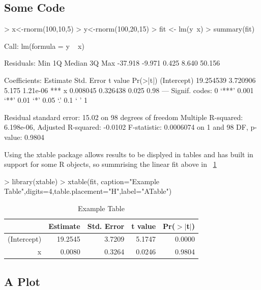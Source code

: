 \documentclass[a4paper]{report}
\begin{document}
\subsection{Some Code}
\begin{Schunk}
\begin{Sinput}
> x<-rnorm(100,10,5)
> y<-rnorm(100,20,15)
> fit <- lm(y~x)
> summary(fit)
\end{Sinput}
\begin{Soutput}
Call:
lm(formula = y ~ x)

Residuals:
    Min      1Q  Median      3Q     Max 
-37.918  -9.971   0.425   8.640  50.156 

Coefficients:
             Estimate Std. Error t value Pr(>|t|)    
(Intercept) 19.254539   3.720906   5.175 1.21e-06 ***
x            0.008045   0.326438   0.025     0.98    
---
Signif. codes:  0 ‘***’ 0.001 ‘**’ 0.01 ‘*’ 0.05 ‘.’ 0.1 ‘ ’ 1

Residual standard error: 15.02 on 98 degrees of freedom
Multiple R-squared:  6.198e-06,	Adjusted R-squared:  -0.0102 
F-statistic: 0.0006074 on 1 and 98 DF,  p-value: 0.9804
\end{Soutput}
\end{Schunk}
Using the xtable package allows results to be displyed in tables and has built in support for some R objects, so summrising the linear fit above in ~\ref{ATable}
\begin{Schunk}
\begin{Sinput}
> library(xtable)
> xtable(fit, caption="Example Table",digits=4,table.placement="H",label="ATable")
\end{Sinput}
\begin{table}[ht]
\centering
\begin{tabular}{rrrrr}
  \hline
 & Estimate & Std. Error & t value & Pr($>$$|$t$|$) \\ 
  \hline
(Intercept) & 19.2545 & 3.7209 & 5.1747 & 0.0000 \\ 
  x & 0.0080 & 0.3264 & 0.0246 & 0.9804 \\ 
   \hline
\end{tabular}
\caption{Example Table} 
\label{ATable}
\end{table}\end{Schunk}
\subsection{A Plot}
 
\end{document}
